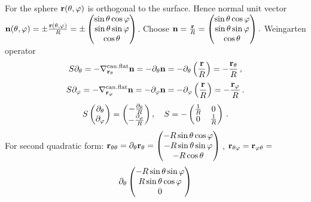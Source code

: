 \documentclass[12pt]{article}
\theoremstyle{theorem}
\numberwithin{equation}{section}
\begin{document}
{For the sphere $\r(\theta,\varphi)$ is orthogonal to the surface.
       Hence
   normal unit vector
   $   \n(\theta,\varphi)=\pm {\r(\theta,\varphi)\over R}=\pm
   \begin{pmatrix}
    \sin\theta\cos\varphi\cr
     \sin\theta\sin\varphi\cr
      \cos\theta\cr
   \end{pmatrix}$.
           Choose $\n= {\r\over R}=
   \begin{pmatrix}
    \sin\theta\cos\varphi\cr
     \sin\theta\sin\varphi\cr
      \cos\theta\cr
   \end{pmatrix}.
     $
     Weingarten operator
     \begin{equation*}\label{weingrartenforcylinder}
        S\partial_\theta=-\nabla^{\rm can.flat}_{{\bf r}_\theta}{\bf n}=-\partial_\theta {\bf n}=
          -\partial_\theta\left({{\bf r}\over R}\right)=-{{\bf r}_\theta\over R}\,,
       \end{equation*}
       \begin{equation*}\label{weingrartenforcylinder}
       S\partial_\varphi=-\nabla^{\rm can.flat}_{{\bf r}_\varphi}{\bf n}=-\partial_\varphi {\bf n}=
          -\partial_\varphi\left({{\bf r}\over R}\right)=-{{\bf r}_\varphi\over R}\,.
    \end{equation*}
\begin{equation}\label{weingrartenforcylinder2}
           S
   \begin{pmatrix}
        \partial_\theta \cr
        \partial_\varphi\cr
   \end{pmatrix}=
   \begin{pmatrix}
         -{\partial_\theta\over R}\cr
        -{\partial_\varphi\over R}\cr
   \end{pmatrix},\quad S=
        -
   \begin{pmatrix}{1\over R}&0\cr 0 &{1\over R}\end{pmatrix}\,.
    \end{equation}
For second quadratic form:  $\r_{\theta\theta}=\p_\theta\r_\theta=
  \begin{pmatrix}
        -R\sin\theta\cos\varphi\\
        -R\sin\theta\sin\varphi\\
        -R\cos\theta\\
   \end{pmatrix}\,$, $\r_{\theta\varphi}=\r_{\varphi \theta}=$
             $$
             \p_\theta
       \begin{pmatrix}
        -R\sin\theta\sin\varphi\\
        R\sin\theta\cos\varphi\\
          0\\

\end{pmatrix}$$}
\end{document}
